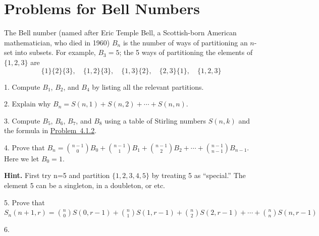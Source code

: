 \documentclass[10pt,]{book}
\theoremstyle{plain}
\theoremstyle{definition}
\theoremstyle{definition}
\numberwithin{equation}{chapter}
\begin{document}
\section[{Problems for Bell Numbers}]{Problems for Bell Numbers}\label{exercises-4}
\hypertarget{p-164}{}%
The Bell number (named after Eric Temple Bell, a Scottish-born American mathematician, who died in 1960) \(B_{n}\) is the number of ways of partitioning an \(n\)-set into subsets. For example, \(B_{3} = 5\); the 5  ways of partitioning the elements of \(\{1, 2, 3\}\) are%
\begin{equation*}
\{1\} \{2\} \{3\},\quad \{1, 2\} \{3\},\quad  \{1, 3\} \{2\}, \quad \{2, 3\} \{1\}, \quad \{1, 2, 3\}
\end{equation*}
%
\begin{exerciselist}
\item[1.]\hypertarget{exercise-58}{}\hypertarget{p-165}{}%
Compute \(B_{1}\), \(B_{2}\), and \(B_{4}\) by listing all the relevant partitions.%
\par\smallskip
\item[2.]\hypertarget{ex-bell-as-stirlings}{}\hypertarget{p-166}{}%
Explain why \(B_{n} = S\left( n,1 \right) + S\left( n,2 \right) + \cdots + S(n,n)\).%
\par\smallskip
\item[3.]\hypertarget{exercise-60}{}\hypertarget{p-167}{}%
Compute \(B_{5}\), \(B_{6}\), \(B_{7}\), and \(B_{8}\) using a table of Stirling numbers \(S(n,k)\) and the formula in \hyperlink{ex-bell-as-stirlings}{Problem~4.1.2}.%
\par\smallskip
\item[4.]\hypertarget{ex-bell-recurrence}{}\hypertarget{p-168}{}%
Prove that \(B_{n} =  \binom{n - 1}{0} B_{0} + \binom{n - 1}{1} B_{1} + \binom{n - 1}{2} B_{2} + \cdots + \binom{n - 1}{n - 1} B_{n - 1}\).  Here we let \(B_0 = 1\).%
\par\smallskip
\par\smallskip%
\noindent\textbf{Hint.}\hypertarget{hint-3}{}\quad%
\hypertarget{p-169}{}%
First try n=5 and partition \(\{ 1,2,3,4,5\}\) by treating 5 as ``special.'' The element 5 can be a singleton, in a doubleton, or etc.%
\item[5.]\hypertarget{ex-stirling-recurrence}{}\hypertarget{p-170}{}%
Prove that \(S_{n}(n + 1, r) = \binom{n}{0} S(0, r - 1) + \binom{n}{1} S(1, r - 1) + \binom{n}{2} S(2, r - 1) + \cdots + \binom{n}{n} S(n, r - 1)\)%
\par\smallskip
\item[6.]\hypertarget{exercise-63}{}\hypertarget{p-171}{}%

\end{exerciselist}
\end{document}
